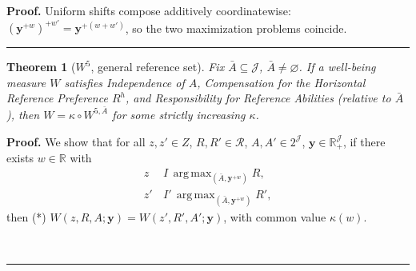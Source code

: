 \documentclass[12pt,thmsb]{article}
\DeclareMathOperator*{\argmax}{arg\,max}
\newtheorem{theorem}{Theorem}
\newenvironment{proof}[1][Proof]{\noindent \textbf{#1.} }{\  \rule{0.5em}{0.5em}}
\begin{document}
\begin{proof}
Uniform shifts compose additively coordinatewise:
$(\mathbf y^{+w})^{+w'}=\mathbf y^{+(w+w')}$, so the two maximization problems
coincide.
\end{proof}

\begin{theorem}[$W^5$, general reference set]
\label{thm:w5gen}
Fix $\bar A\subseteq\mathcal J$, $\bar A\neq\varnothing$. If a well-being measure
$W$ satisfies Independence of $A$, Compensation for the Horizontal Reference
Preference $R^h$, and Responsibility for Reference Abilities (relative to
$\bar A$), then $W=\kappa\circ W^{5,\bar A}$ for some strictly increasing
$\kappa$.
\end{theorem}

\begin{proof}
We show that for all $z,z'\in Z$, $R,R'\in\mathcal R$, $A,A'\in 2^{\mathcal J}$,
$\mathbf y\in\mathbb R_+^{\mathcal J}$, if there exists $w\in\mathbb R$ with
\begin{align}
z\,&I\,\argmax_{(\bar A,\mathbf y^{+w})}R, \label{th_5a_z}\\
z'\,&I'\,\argmax_{(\bar A,\mathbf y^{+w})}R', \label{th_5a_zp}
\end{align}
then (*) $W(z,R,A;\mathbf y)=W(z',R',A';\mathbf y)$, with common value
$\kappa(w)$.


\end{proof}
\end{document}
